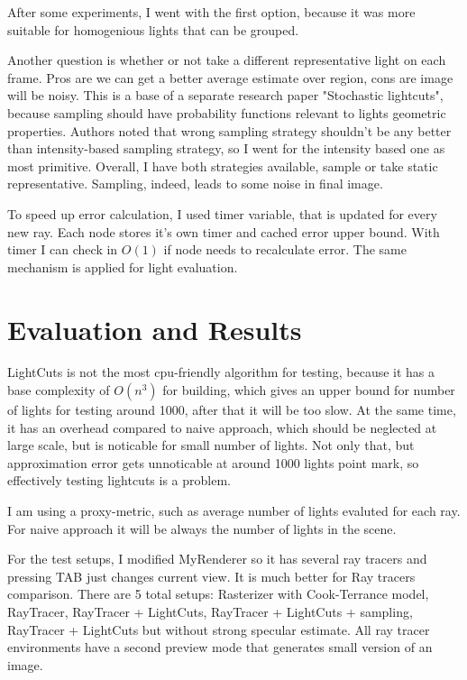 \documentclass[twocolumn]{article}
\begin{document}
After some experiments, I went with the first option, because it was more suitable for homogenious lights that can be grouped.

Another question is whether or not take a different representative light on each frame.
Pros are we can get a better average estimate over region, cons are image will be noisy.
This is a base of a separate research paper "Stochastic lightcuts", because sampling should have probability functions relevant to lights geometric properties.
Authors noted that wrong sampling strategy shouldn't be any better than intensity-based sampling strategy, so I went for the intensity based one as most primitive.
Overall, I have both strategies available, sample or take static representative.
Sampling, indeed, leads to some noise in final image.

To speed up error calculation, I used timer variable, that is updated for every new ray.
Each node stores it's own timer and cached error upper bound.
With timer I can check in $O(1)$ if node needs to recalculate error.
The same mechanism is applied for light evaluation.

\section{Evaluation and Results}

LightCuts is not the most cpu-friendly algorithm for testing, because it has a base complexity of $O(n^3)$ for building,
which gives an upper bound for number of lights for testing around 1000, after that it will be too slow.
At the same time, it has an overhead compared to naive approach, which should be neglected at large scale, but is noticable for small number of lights.
Not only that, but approximation error gets unnoticable at around 1000 lights point mark, so effectively testing lightcuts is a problem.

I am using a proxy-metric, such as average number of lights evaluted for each ray. For naive approach it will be always the number of lights in the scene.

For the test setups, I modified MyRenderer so it has several ray tracers and pressing TAB just changes current view. It is much better for Ray tracers comparison.
There are 5 total setups: Rasterizer with Cook-Terrance model, RayTracer, RayTracer + LightCuts, RayTracer + LightCuts + sampling, RayTracer + LightCuts but without strong specular estimate.
All ray tracer environments have a second preview mode that generates small version of an image.
\end{document}
